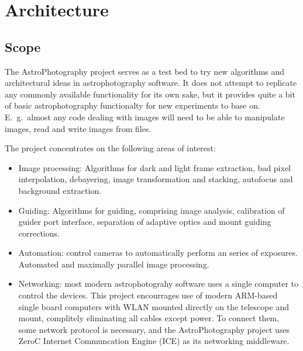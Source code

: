 %
%
%
\chapter{Architecture\label{chapter:architecture}}
\section{Scope}
The AstroPhotography project serves as a test bed to try new algorithms
and architectural ideas in astrophotography software.
It does not attempt to replicate any commonly available functionality
for its own sake, but it provides quite a bit of basic astrophotography
functionalty for new experiments to base on.
E.~g.~almost any code dealing with images will need to be able to
manipulate images, read and write images from files.

The project concentrates on the following areas of interest:
\begin{itemize}
\item Image processing: Algorithms for dark and light frame extraction,
bad pixel interpolation, debayering, image transformation and stacking,
autofocus and background extraction.
\item Guiding: Algorithms for guiding, comprising image analysis, 
calibration of guider port interface, separation of adaptive optics
and mount guiding corrections.
\item Automation: control cameras to automatically perform an series of
exposures.
Automated and maximally parallel image processing.
\item Networking: most modern astrophotograhy software uses a single
computer to control the devices.
This project encourrages use of modern ARM-based single board computers
with WLAN mounted directly on the telescope and mount, complitely eliminating
all cables except power.
To connect them, some network protocol is necessary, and the
AstroPhotography project uses ZeroC Internet Communcation Engine (ICE)
as its networking middleware.
\end{itemize}


